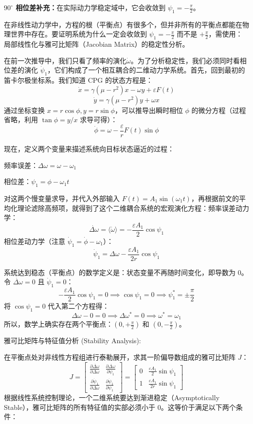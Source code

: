 \documentclass[12pt, a4paper]{ctexart}
\begin{document}
\vspace{10pt}
\textbf{$90^\circ$ 相位差补充：}在实际动力学稳定域中，它会收敛到 $\psi_1 = -\frac{\pi}{2}$。

在非线性动力学中，方程的根（平衡点）有很多个，但并非所有的平衡点都能在物理世界中存在。要证明系统为什么一定会收敛到 $\psi_1 = -\frac{\pi}{2}$ 而不是 $+\frac{\pi}{2}$，需使用：局部线性化与雅可比矩阵（Jacobian Matrix）的稳定性分析。

在前一次推导中，我们只看了频率的演化$\dot{\omega}$。为了分析稳定性，我们必须同时看相位差的演化 $\dot{\psi}_1$，它们构成了一个相互耦合的二维动力学系统。首先，回到最初的笛卡尔极坐标系。我们知道 CPG 的状态方程是：
$$\dot{x} = \gamma (\mu - r^2)x - \omega y + \varepsilon F(t)$$$$\dot{y} = \gamma (\mu - r^2)y + \omega x$$通过坐标变换 $x = r \cos\phi, y = r \sin\phi$，可以推导出瞬时相位 $\phi$ 的微分方程（过程省略，利用 $\tan\phi = y/x$ 求导可得）：$$\dot{\phi} = \omega - \frac{\varepsilon}{r} F(t) \sin\phi$$

现在，定义两个变量来描述系统向目标状态逼近的过程：

频率误差：$\Delta\omega = \omega - \omega_1$

相位差：$\psi_1 = \phi - \omega_1 t$

对这两个慢变量求导，并代入外部输入 $F(t) = A_1 \sin(\omega_1 t)$，再根据前文的平均化理论滤除高频项，就得到了这个二维耦合系统的宏观演化方程：频率误差动力学：$$\dot{\Delta\omega} = \langle \dot{\omega} \rangle = -\frac{\varepsilon A_1}{2} \cos\psi_1$$相位差动力学（注意 $\dot{\psi}_1 = \dot{\phi} - \omega_1$）：$$\dot{\psi}_1 = \Delta\omega - \frac{\varepsilon A_1}{2r} \cos\psi_1$$

系统达到稳态（平衡点）的数学定义是：状态变量不再随时间变化，即导数为 0。
令 $\dot{\Delta\omega} = 0$ 且 $\dot{\psi}_1 = 0$：$$-\frac{\varepsilon A_1}{2} \cos\psi_1 = 0 \implies \cos\psi_1 = 0 \implies \psi_1^* = \pm \frac{\pi}{2}$$将 $\cos\psi_1 = 0$ 代入第二个方程得：$$\Delta\omega - 0 = 0 \implies \Delta\omega^* = 0 \implies \omega^* = \omega_1$$所以，数学上确实存在两个平衡点：$(0, +\frac{\pi}{2})$ 和 $(0, -\frac{\pi}{2})$。

雅可比矩阵与特征值分析 (Stability Analysis):

在平衡点处对非线性方程组进行泰勒展开，求其一阶偏导数组成的雅可比矩阵 $J$：$$J = \begin{bmatrix} \frac{\partial \dot{\Delta\omega}}{\partial \Delta\omega} & \frac{\partial \dot{\Delta\omega}}{\partial \psi_1} \\ \frac{\partial \dot{\psi}_1}{\partial \Delta\omega} & \frac{\partial \dot{\psi}_1}{\partial \psi_1} \end{bmatrix} = \begin{bmatrix} 0 & \frac{\varepsilon A_1}{2} \sin\psi_1 \\ 1 & \frac{\varepsilon A_1}{2r} \sin\psi_1 \end{bmatrix}$$
根据线性系统控制理论，一个二维系统要达到渐进稳定（Asymptotically Stable），雅可比矩阵的所有特征值的实部必须小于 0。这等价于满足以下两个条件：
\end{document}
